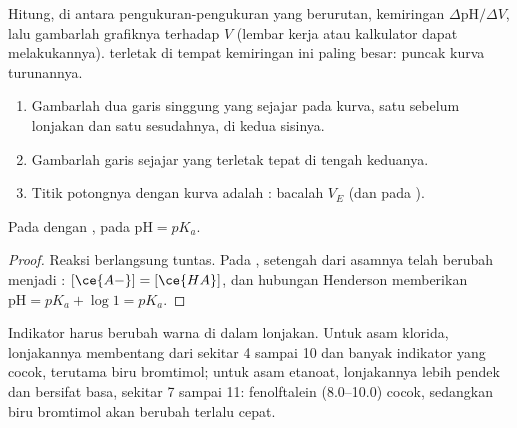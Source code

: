 \begin{method}\label{met:g12:ph-conductivity-titrations:derivative}
Hitung, di antara pengukuran-pengukuran yang berurutan, kemiringan
$\Delta\mathrm{pH}/\Delta V$, lalu gambarlah grafiknya terhadap $V$
(lembar kerja atau kalkulator dapat melakukannya). 
terletak di tempat kemiringan ini paling besar: puncak kurva turunannya.
\end{method}

\begin{method}\label{met:g12:ph-conductivity-titrations:tangent}
\begin{enumerate}
  \item Gambarlah dua garis singgung yang sejajar pada kurva, satu
        sebelum lonjakan dan satu sesudahnya, di kedua sisinya.
  \item Gambarlah garis sejajar yang terletak tepat di tengah keduanya.
  \item Titik potongnya dengan kurva adalah : bacalah
        $V_E$ (dan  pada ).
\end{enumerate}
\end{method}

\begin{proposition}[Pada setengah ekuivalen, $\mathrm{pH} = pK_a$]\label{prop:g12:ph-conductivity-titrations:half}
Pada    dengan , pada  $\mathrm{pH} = pK_a$.
\end{proposition}

\begin{proof}
Reaksi  berlangsung tuntas. Pada , setengah dari asamnya telah berubah menjadi :
$[\ce{A-}] = [\ce{HA}]$, dan hubungan Henderson memberikan
$\mathrm{pH} = pK_a + \log 1 = pK_a$.
\end{proof}

\begin{remark}\label{rem:g12:ph-conductivity-titrations:indicator}
Indikator harus berubah warna di dalam lonjakan. Untuk asam klorida,
lonjakannya membentang dari sekitar  4 sampai 10 dan banyak indikator
yang cocok, terutama biru bromtimol; untuk asam etanoat, lonjakannya
lebih pendek dan bersifat basa, sekitar 7 sampai 11: fenolftalein
(8.0--10.0) cocok, sedangkan biru bromtimol akan berubah terlalu cepat.
\end{remark}

